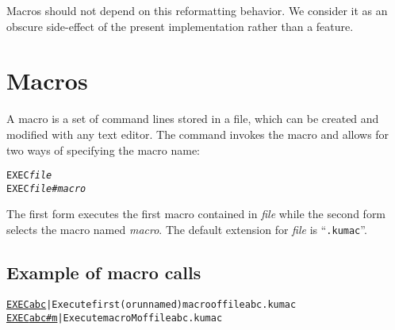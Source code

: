 Macros should not depend on this reformatting behavior.
We consider it as an obscure side-effect of the present implementation
rather than a feature.

\normalsize

\section{Macros}

A macro is a set of command lines stored in a file,
which can be created and modified with any text editor.
The command  invokes the macro and allows for two ways of
specifying the macro name:
\begin{alltt}
EXEC \textsl{file}
EXEC \textsl{file}\#\textsl{macro}
\end{alltt}
The first form executes the first macro contained in \textsl{file}
while the second form selects the macro named \textsl{macro}.
The default extension for \textsl{file} is ``\texttt{.kumac}''.

\subsection*{Example of macro calls}
\begin{alltt}
\PROMPT{} \underline{EXEC abc}   | Execute first (or unnamed) macro of file abc.kumac
\PROMPT{} \underline{EXEC abc#m} | Execute macro M of file abc.kumac
\end{alltt}


